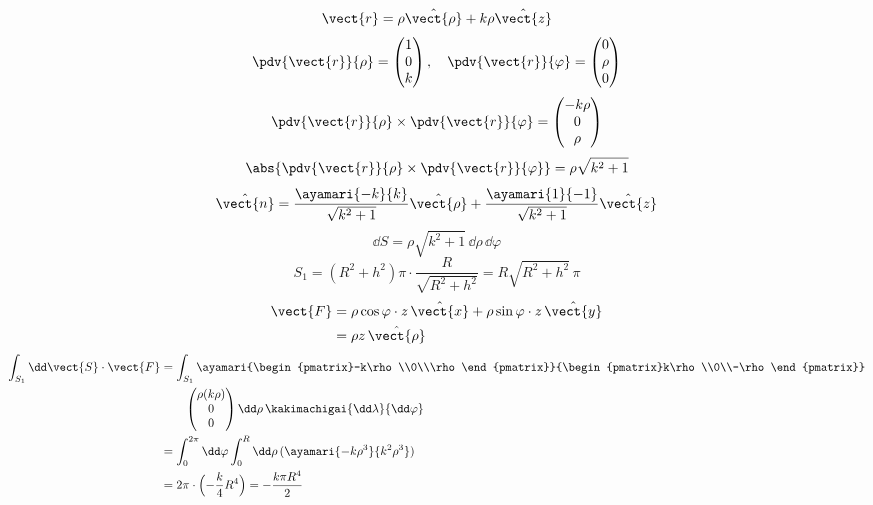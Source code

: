 \[ \vect{r}=\rho\hat{\vect{\rho}}+k\rho\hat{\vect{z}} \]
\[ \pdv{\vect{r}}{\rho}=\begin{pmatrix}1\\0\\k\end{pmatrix},\quad\pdv{\vect{r}}{\varphi}=\begin{pmatrix}0\\\rho\\0\end{pmatrix} \]
\[ \pdv{\vect{r}}{\rho}\times\pdv{\vect{r}}{\varphi}=\begin{pmatrix}-k\rho\\0\\\rho\end{pmatrix} \]
\[ \abs{\pdv{\vect{r}}{\rho}\times\pdv{\vect{r}}{\varphi}}=\rho\sqrt{k^{2}+1} \]
\[ \hat{\vect{n}}=\frac{\ayamari{-k}{k}}{\sqrt{k^{2}+1}}\hat{\vect{\rho}}+\frac{\ayamari{1}{-1}}{\sqrt{k^{2}+1}}\hat{\vect{z}} \]
\[ \dd S=\rho\sqrt{k^{2}+1}\,\dd\rho\,\dd\varphi \]
\[ S_{1}=(R^{2}+h^{2})\pi\cdot\frac{R}{\sqrt{R^{2}+h^{2}}}=R\sqrt{R^{2}+h^{2}}\,\pi \]
\begin{align*}
\vect{F}&=\rho\cos\varphi\cdot z\,\hat{\vect{x}}+\rho\sin\varphi\cdot z\,\hat{\vect{y}}\\
&=\rho z\,\hat{\vect{\rho}}
\end{align*}
\begin{align*}
\int_{S_{1}}\dd\vect{S}\cdot\vect{F}&=\int_{S_{1}}\ayamari{\begin{pmatrix}-k\rho\\0\\\rho\end{pmatrix}}{\begin{pmatrix}k\rho\\0\\-\rho\end{pmatrix}}\\
&\qquad\begin{pmatrix}\rho(k\rho)\\0\\0\end{pmatrix}\dd\rho\,\kakimachigai{\dd\lambda}{\dd\varphi}\\
&=\int_{0}^{2\pi}\dd\varphi\int_{0}^{R}\dd\rho\,(\ayamari{-k\rho^{3}}{k^{2}\rho^{3}})\\
&=2\pi\cdot\Bigl(-\frac{k}{4}R^{4}\Bigr)=-\frac{k\pi R^{4}}{2}
\end{align*}

